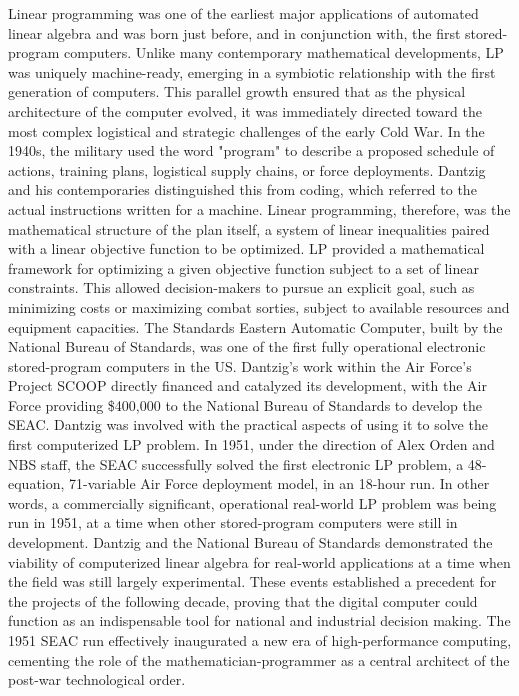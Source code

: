 Linear programming was one of the earliest major applications of automated linear algebra and was born just before, and in conjunction with, the first stored-program computers. Unlike many contemporary mathematical developments, LP was uniquely machine-ready, emerging in a symbiotic relationship with the first generation of computers. This parallel growth ensured that as the physical architecture of the computer evolved, it was immediately directed toward the most complex logistical and strategic challenges of the early Cold War. In the 1940s, the military used the word "program" to describe a proposed schedule of actions, training plans, logistical supply chains, or force deployments. Dantzig and his contemporaries distinguished this from coding, which referred to the actual instructions written for a machine. Linear programming, therefore, was the mathematical structure of the plan itself, a system of linear inequalities paired with a linear objective function to be optimized. LP provided a mathematical framework for optimizing a given objective function subject to a set of linear constraints. This allowed decision-makers to pursue an explicit goal, such as minimizing costs or maximizing combat sorties, subject to available resources and equipment capacities. The Standards Eastern Automatic Computer, built by the National Bureau of Standards, was one of the first fully operational electronic stored-program computers in the US. Dantzig's work within the Air Force's Project SCOOP directly financed and catalyzed its development, with the Air Force providing \$400,000 to the National Bureau of Standards to develop the SEAC. Dantzig was involved with the practical aspects of using it to solve the first computerized LP problem. In 1951, under the direction of Alex Orden and NBS staff, the SEAC successfully solved the first electronic LP problem, a 48-equation, 71-variable Air Force deployment model, in an 18-hour run. In other words, a commercially significant, operational real-world LP problem was being run in 1951, at a time when other stored-program computers were still in development. Dantzig and the National Bureau of Standards demonstrated the viability of computerized linear algebra for real-world applications at a time when the field was still largely experimental. These events established a precedent for the projects of the following decade, proving that the digital computer could function as an indispensable tool for national and industrial decision making. The 1951 SEAC run effectively inaugurated a new era of high-performance computing, cementing the role of the mathematician-programmer as a central architect of the post-war technological order.

